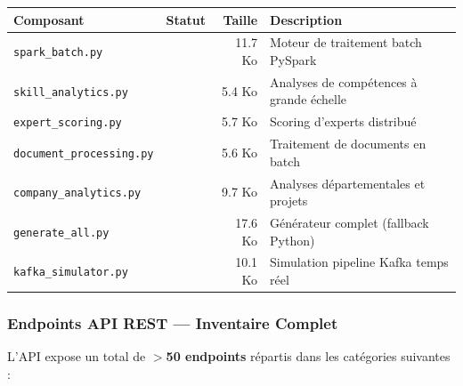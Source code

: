 \documentclass[12pt,a4paper]{article}
\newcommand{\cmark}{\textcolor{vert}{\ding{51}}}
\begin{document}
\begin{center}
\renewcommand{\arraystretch}{1.3}
\begin{tabular}{|l|c|r|l|}
\hline
\rowcolor{bleu!15}
\textbf{Composant} & \textbf{Statut} & \textbf{Taille} & \textbf{Description} \\
\hline
\texttt{spark\_batch.py} & \cmark & 11.7 Ko & Moteur de traitement batch PySpark \\
\hline
\texttt{skill\_analytics.py} & \cmark & 5.4 Ko & Analyses de compétences à grande échelle \\
\hline
\texttt{expert\_scoring.py} & \cmark & 5.7 Ko & Scoring d'experts distribué \\
\hline
\texttt{document\_processing.py} & \cmark & 5.6 Ko & Traitement de documents en batch \\
\hline
\texttt{company\_analytics.py} & \cmark & 9.7 Ko & Analyses départementales et projets \\
\hline
\texttt{generate\_all.py} & \cmark & 17.6 Ko & Générateur complet (fallback Python) \\
\hline
\texttt{kafka\_simulator.py} & \cmark & 10.1 Ko & Simulation pipeline Kafka temps réel \\
\hline
\end{tabular}
\end{center}

\subsubsection{Endpoints API REST — Inventaire Complet}

L'API expose un total de \textbf{$>$50 endpoints} répartis dans les catégories suivantes :
\end{document}
